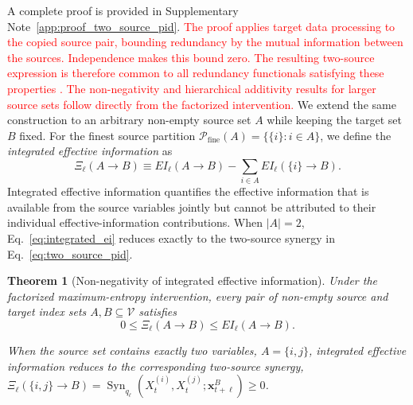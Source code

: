 \documentclass[fleqn,10pt]{wlscirep}
\newcommand{\rev}[1]{\textcolor{red}{#1}}
\theoremstyle{naturetheorem}
\newtheorem{theorem}{Theorem}
\begin{document}
A complete proof is provided in
Supplementary Note~\ref{app:proof_two_source_pid}. \rev{The proof applies target data processing to the copied source pair, bounding redundancy by the mutual information between the sources. Independence makes this bound zero. The resulting two-source expression is therefore common to all redundancy functionals satisfying these properties \cite{Harder2013BivariateRedundancy,Rauh2017ExtractableSharedInformation}. The non-negativity and hierarchical additivity results for larger source sets follow directly from the factorized intervention.} We extend the same
construction to an arbitrary non-empty source set \(A\) while keeping the
target set \(B\) fixed. For the finest source partition
\(\mathcal{P}_{\mathrm{fine}}(A)=\{\{i\}:i\in A\}\), we define the
\emph{integrated effective information} as
\begin{equation}
    \Xi_{\ell}(A\rightarrow B)
    \equiv
    EI_{\ell}(A\rightarrow B)
    -
    \sum_{i\in A}
    EI_{\ell}(\{i\}\rightarrow B).
    \label{eq:integrated_ei}
\end{equation}
Integrated effective information quantifies the effective information that is
available from the source variables jointly but cannot be attributed to their
individual effective-information contributions. When \(|A|=2\),
Eq.~\eqref{eq:integrated_ei} reduces exactly to the two-source synergy in
Eq.~\eqref{eq:two_source_pid}.

\begin{theorem}[Non-negativity of integrated effective information]
\label{thm:integrated_ei_nonnegativity}
Under the factorized maximum-entropy intervention, every pair of non-empty
source and target index sets \(A,B\subseteq\mathcal{V}\) satisfies
\begin{equation}
    0
    \leq
    \Xi_{\ell}(A\rightarrow B)
    \leq
    EI_{\ell}(A\rightarrow B).
    \label{eq:integrated_ei_bounds}
\end{equation}

When the source set contains exactly two variables, \(A=\{i,j\}\), integrated effective information reduces to the corresponding two-source synergy, \(\Xi_{\ell}(\{i,j\}\rightarrow B)=\operatorname{Syn}_{q_{\ell}}\!\left(X_t^{(i)},X_t^{(j)};\boldsymbol{x}_{t+\ell}^{B}\right)\geq 0\).
\end{theorem}
\end{document}
